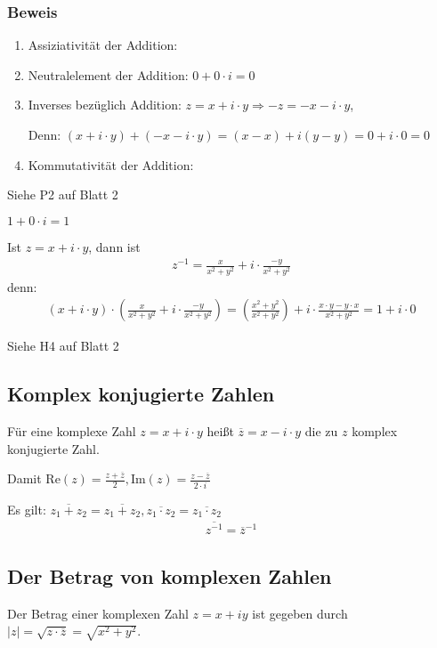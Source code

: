 \subsubsection{Beweis}
\begin{enumerate}
\item{Assiziativität der Addition: \cmark}
\item{Neutralelement der Addition: $0 + 0 \cdot i = 0$ \cmark}
\item{Inverses bezüglich Addition: $z = x + i \cdot y \Rightarrow -z = -x - i \cdot y$,

Denn: $(x + i \cdot y) + (-x - i \cdot y) = (x - x) + i (y - y) = 0 + i \cdot 0 = 0$ \cmark}
\item{Kommutativität der Addition: \cmark}
\end{enumerate}

Siehe P2 auf Blatt 2

$1 + 0 \cdot i = 1$

Ist $z = x + i \cdot y$, dann ist
\begin{align*}
	z^{-1} = \frac{x}{x^2 + y^2} + i \cdot \frac{-y}{x^2 + y^2}
\end{align*}
denn:
\begin{align*}
(x + i \cdot y) \cdot \left(\frac{x}{x^2 + y^2} + i \cdot \frac{-y}{x^2 + y^2}\right) = \left(\frac{x^2 + y^2}{x^2 + y^2}\right) + i \cdot \frac{x \cdot y - y \cdot x}{x^2 + y^2} = 1 + i \cdot 0
\end{align*}

Siehe H4 auf Blatt 2

\subsection{Komplex konjugierte Zahlen}
Für eine komplexe Zahl $z = x + i \cdot y$ heißt $\overline{z} = x - i \cdot y$ die zu $z$ komplex konjugierte Zahl.

Damit $\text{Re}(z) = \frac{z+\overline{z}}{2}, \text{Im}(z)=\frac{z-\overline{z}}{2\cdot i}$

Es gilt: $\overline{z_1 + z_2} = \overline{z_1 + z_2}, \overline{z_1 \cdot z_2} = \overline{z_1 \cdot z_2}$
\begin{align*}
\overline{z^{-1}} = \overline{z}^{-1}
\end{align*}

\subsection{Der Betrag von komplexen Zahlen}
Der Betrag einer komplexen Zahl $z = x+iy$ ist gegeben durch $|z| = \sqrt{z \cdot \overline{z}} = \sqrt{x^2 + y^2}$.

